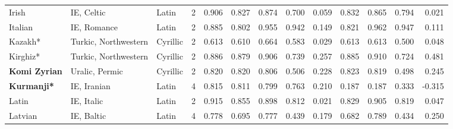 \begin{tabular}{lllrrrrrrrrrr}
                          Irish &                      IE, Celtic &      Latin &         2 &                       0.906 &                         0.827 &         0.874 &                  0.700 &            0.059 &                         0.832 &         0.865 &                  0.794 &            0.021 \\
                        Italian &                     IE, Romance &      Latin &         2 &                       0.885 &                         0.802 &         0.955 &                  0.942 &            0.149 &                         0.821 &         0.962 &                  0.947 &            0.111 \\
                        Kazakh* &            Turkic, Northwestern &   Cyrillic &         2 &                       0.613 &                         0.610 &         0.664 &                  0.583 &            0.029 &                         0.613 &         0.613 &                  0.500 &            0.048 \\
                       Kirghiz* &            Turkic, Northwestern &   Cyrillic &         2 &                       0.886 &                         0.879 &         0.906 &                  0.739 &            0.257 &                         0.885 &         0.910 &                  0.724 &            0.481 \\
           \textbf{Komi Zyrian} &                  Uralic, Permic &   Cyrillic &         2 &                       0.820 &                         0.820 &         0.806 &                  0.506 &            0.228 &                         0.823 &         0.819 &                  0.498 &            0.245 \\
             \textbf{Kurmanji*} &                     IE, Iranian &      Latin &         4 &                       0.815 &                         0.811 &         0.799 &                  0.763 &            0.210 &                         0.187 &         0.187 &                  0.333 &           -0.315 \\
                          Latin &                      IE, Italic &      Latin &         2 &                       0.915 &                         0.855 &         0.898 &                  0.812 &            0.021 &                         0.829 &         0.905 &                  0.819 &            0.047 \\
                        Latvian &                      IE, Baltic &      Latin &         4 &                       0.778 &                         0.695 &         0.777 &                  0.439 &            0.179 &                         0.682 &         0.789 &                  0.434 &            0.250 \\

\end{tabular}
